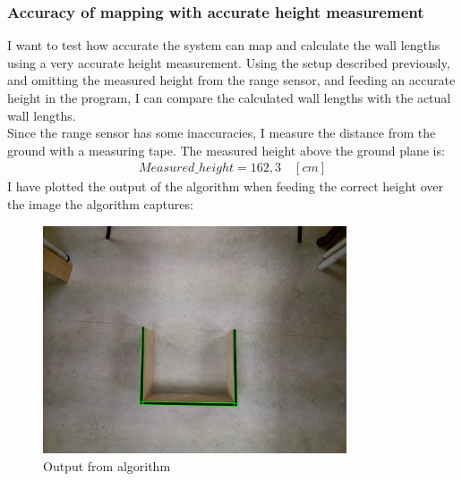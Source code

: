 \subsubsection{Accuracy of mapping with accurate height measurement}
I want to test how accurate the system can map and calculate the wall lengths using a very accurate height measurement. Using the setup described previously, and omitting the measured height from the range sensor, and feeding an accurate height in the program, I can compare the calculated wall lengths with the actual wall lengths. \\

Since the range sensor has some inaccuracies, I measure the distance from the ground with a measuring tape. The measured height above the ground plane is:
\begin{align*}
Measured\_height = 162,3 \quad [cm]
\end{align*}
I have plotted the output of the algorithm when feeding the correct height over the image the algorithm captures:
\begin{figure}[H]
\centering
\includegraphics[width=0.8\textwidth]{fig/houghlines}
  \caption{Output from algorithm}
  \label{fig:houghlines}
\end{figure}

